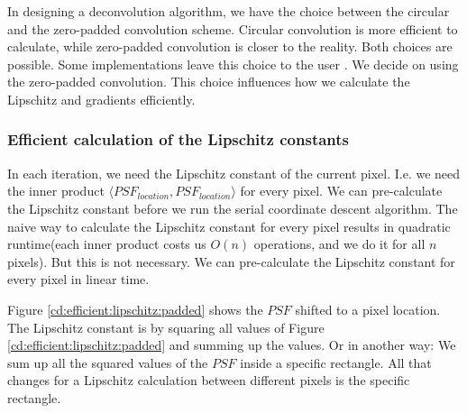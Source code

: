 In designing a deconvolution algorithm, we have the choice between the circular and the zero-padded convolution scheme. Circular convolution is more efficient to calculate, while zero-padded convolution is closer to the reality. Both choices are possible. Some implementations leave this choice to the user \cite{kenyon2019pymoresane}. We decide on using the zero-padded convolution. This choice influences how we calculate the Lipschitz and gradients efficiently.


\subsubsection{Efficient calculation of the Lipschitz constants}
In each iteration, we need the Lipschitz constant of the current pixel. I.e. we need the inner product $\langle PSF_{location}, PSF_{location} \rangle$ for every pixel. We can pre-calculate the Lipschitz constant before we run the serial coordinate descent algorithm. The naive way to calculate the Lipschitz constant for every pixel results in quadratic runtime(each inner product costs us $O(n)$ operations, and we do it for all $n$ pixels). But this is not necessary. We can pre-calculate the Lipschitz constant for every pixel in linear time.

Figure \ref{cd:efficient:lipschitz:padded} shows the $PSF$ shifted to a pixel location. The Lipschitz constant is by squaring all values of Figure \ref{cd:efficient:lipschitz:padded} and summing up the values. Or in another way: We sum up all the squared values of the $PSF$ inside a specific rectangle. All that changes for a Lipschitz calculation between different pixels is the specific rectangle.

